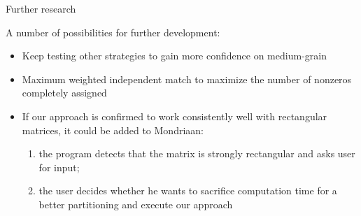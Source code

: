 \documentclass[10pt,serif]{beamer}
\begin{document}
\begin{frame}{Further research}

A number of possibilities for further development:

\begin{itemize}
	\item Keep testing other strategies to gain more confidence on medium-grain
	\item Maximum weighted independent match to maximize the number of nonzeros completely assigned
	\item If our approach is confirmed to work consistently well with rectangular matrices, it could be added to Mondriaan:
		\begin{enumerate}
			\item the program detects that the matrix is strongly rectangular and asks user for input;
			\item the user decides whether he wants to sacrifice computation time for a better partitioning and execute our approach
		\end{enumerate}
\end{itemize}
	
\end{frame}
\end{document}
